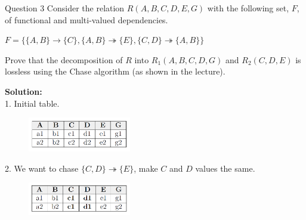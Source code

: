\begin{frame}[fragile]{Question 3}
Consider the relation $R(A,B,C,D,E,G)$ with the following set, $F$, of functional and multi-valued dependencies.\\ \vspace{5pt}
	
$F=\{\{A,B\}\rightarrow\{C\}, \{A,B\}\twoheadrightarrow\{E\},\{C,D\}\twoheadrightarrow\{A,B\}\}$\\ \vspace{5pt}
	
Prove that the decomposition of $R$ into $R_1(A,B,C,D,G)$ and $R_2(C,D,E)$ is lossless using the Chase algorithm (as shown in the lecture).\\ \vspace{5pt}
	
\textbf{Solution:}\\ \vspace{2pt}
1. Initial table.\\
\begin{figure}
	\includegraphics[width=0.4\textwidth, trim=0 0 0 0, clip]{4221-t5/images/3-1.png}
\end{figure}

2. We want to chase $\{C,D\} \twoheadrightarrow \{E\}$, make $C$ and $D$ values the same.\\
\begin{figure}
	\includegraphics[width=0.4\textwidth, trim=0 0 0 0, clip]{4221-t5/images/3-2.png}
\end{figure}

\end{frame}

